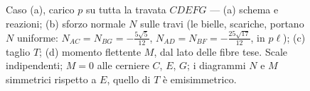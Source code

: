 \begin{figure}[htbp!]
{}
	\caption{Caso (a), carico $p$ su tutta la travata $CDEFG$ --- (a) schema e reazioni; (b) sforzo normale
		$N$ sulle travi (le bielle, scariche, portano $N$ uniforme:
		$N_{AC}=N_{BG}=-\tfrac{5\sqrt5}{12}$, $N_{AD}=N_{BF}=-\tfrac{25\sqrt{17}}{12}$, in $p\ell$);
		(c) taglio $T$; (d) momento flettente $M$, dal lato delle fibre tese. Scale indipendenti;
		$M=0$ alle cerniere $C$, $E$, $G$; i diagrammi $N$ e $M$ simmetrici rispetto a $E$,  quello di $T$ è emisimmetrico.}
	\label{fig:stampella_NTM_a}
\end{figure}
